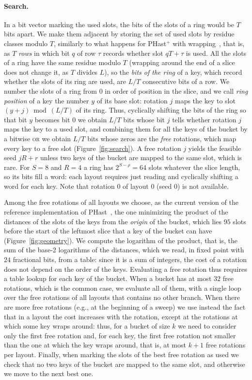 \documentclass[11pt]{article}
\newcommand{\PHast}{PHast\xspace}
\newcommand{\PHastP}{PHast$^+$\xspace}
\begin{document}
\paragraph{Search.}
In a bit vector marking the used slots, the bits of the slots of a ring would be
$T$ bits apart. We make them adjacent by storing the set of used slots by
residue classes modulo $T$, similarly to what happens
for \PHastP with wrapping~\cite{BeSPHast}, that is, as $T$ \emph{rows} in which bit $q$ of
row $\tau$ records whether slot $qT+\tau$ is used. All the slots of a
ring have the same residue modulo $T$ (wrapping around the end of a slice
does not change it, as $T$ divides $L$), so the \emph{bits of the ring} of a
key, which record whether the slots of its ring are used, are $L/T$
consecutive bits of a row. We number the slots of a ring from $0$ in order
of position in the slice, and we call \emph{ring position} of a key the
number $y$ of its base slot: rotation $j$ maps the key to slot
$(y+j)\bmod(L/T)$ of its ring. Thus, cyclically shifting the bits of the
ring so that bit $y$ becomes bit $0$
we obtain $L/T$ bits whose bit $j$ tells whether rotation $j$ maps the key to
a used slot, and combining them for all the keys of the bucket by a bitwise
\textsc{or} we obtain $L/T$ bits whose zeros are the \emph{free} rotations,
which map every key to a free slot (Figure~\ref{fig:search}). A free rotation
$j$ yields the feasible seed $jR+r$ unless two keys of the bucket are mapped
to the same slot, which is rare. For $S=8$ and $R=4$ a ring has
$2^{S-\rho}=64$ slots whatever the slice length, so its bits fill a word:
each layout requires just reading and cyclically shifting a word for each
key. Note that rotation $0$ of layout $0$ (seed $0$) is not available.

Among the free rotations of all layouts we choose, as the current version
of the reference implementation of \PHast~\cite{BelBRLPFSDS}, the one
minimizing the product of the distances of the slots of the keys from the
\emph{origin} of the bucket, which lies $95$ slots before the start of the
leftmost slice that a key of the bucket can have
(Figure~\ref{fig:geometry}). We
compute the logarithm of the product, that is, the sum of the base-2
logarithms of the distances, which we read, in fixed point with $24$
fractional bits, from a table: since it is a sum of integers, the cost of a
rotation does not depend on the order of the keys. Evaluating a free rotation
thus requires a table lookup for each key of the bucket. When a bucket has at
most $32$ free rotations, which is the common case, we evaluate all of them,
with a single loop over the free rotations of all layouts that contains no
other branch. When there are more free rotations (e.g., at the beginning of a
sweep) we use instead the fact that in a layout the cost increases with the
rotation, except at the rotations at which some key wraps around: thus, for a
bucket of size $k$ we need to consider only the first free rotation and, for
each key, the first free rotation not smaller than the one at which the key
wraps around, that is, at most $k+1$ free rotations per layout. Finally, when
marking the slots of the best free rotation as used we check that no two keys
of the bucket are mapped to the same slot, and otherwise we move to the next
best one.
\end{document}
